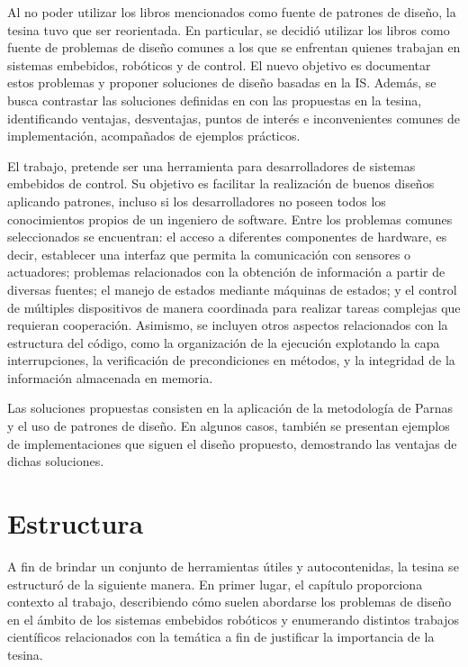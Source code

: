 Al no poder utilizar los libros mencionados como fuente de patrones de diseño, la tesina tuvo que ser reorientada. En particular, se decidió utilizar los libros como fuente de problemas de diseño comunes a los que se enfrentan quienes trabajan en sistemas embebidos, robóticos y de control. El nuevo objetivo es documentar estos problemas y proponer soluciones de diseño basadas en la IS. Además, se busca contrastar las soluciones definidas en \cite{douglass} con las propuestas en la tesina, identificando ventajas, desventajas, puntos de interés e inconvenientes comunes de implementación, acompañados de ejemplos prácticos.

El trabajo, pretende ser una herramienta para desarrolladores de sistemas embebidos de control. Su objetivo es facilitar la realización de buenos diseños aplicando patrones, incluso si los desarrolladores no poseen todos los conocimientos propios de un ingeniero de software. Entre los problemas comunes seleccionados se encuentran: el acceso a diferentes componentes de hardware, es decir, establecer una interfaz que permita la comunicación con sensores o actuadores; problemas relacionados con la obtención de información a partir de diversas fuentes; el manejo de estados mediante máquinas de estados; y el control de múltiples dispositivos de manera coordinada para realizar tareas complejas que requieran cooperación. Asimismo, se incluyen otros aspectos relacionados con la estructura del código, como la organización de la ejecución explotando la capa interrupciones, la verificación de precondiciones en métodos, y la integridad de la información almacenada en memoria.

Las soluciones propuestas consisten en la aplicación de la metodología de Parnas \cite{parnas72} y el uso de patrones de diseño. En algunos casos, también se presentan ejemplos de implementaciones que siguen el diseño propuesto, demostrando las ventajas de dichas soluciones.

\section*{Estructura}

A fin de brindar un conjunto de herramientas útiles y autocontenidas, la tesina se estructuró de la siguiente manera. En primer lugar, el capítulo  proporciona contexto al trabajo, describiendo cómo suelen abordarse los problemas de diseño en el ámbito de los sistemas embebidos robóticos y enumerando distintos trabajos científicos relacionados con la temática a fin de justificar la importancia de la tesina.

